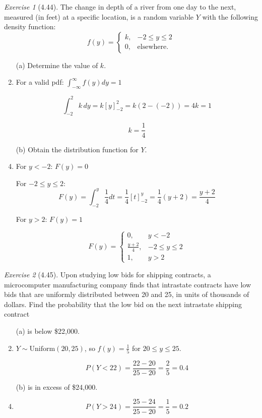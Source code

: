 \documentclass[12pt]{amsart}
\makeatletter
\theoremstyle{remark}
\newtheorem*{exercise}{Exercise}%
\renewenvironment{proof}[1][\proofname]{\par\doublespacing
  \pushQED{\qed}%
  \normalfont \topsep6\p@\@plus6\p@\relax
  \list{}{%
    \settowidth{\leftmargin}{\itshape\proofname:\hskip\labelsep}%
    \setlength{\labelwidth}{0pt}%
    \setlength{\itemindent}{-\leftmargin}%
  }%
  \item[\hskip\labelsep\itshape#1\@addpunct{:}]\ignorespaces
}{%
  \popQED\endlist\@endpefalse
  \singlespacing
}
\theoremstyle{mycomment}
\makeatother
\begin{document}
\begin{exercise}[4.44]
The change in depth of a river from one day to the next, measured (in feet) at a specific location, is a random variable $Y$ with the following density function:
$$f(y) = \begin{cases}
k, & -2 \leq y \leq 2 \\
0, & \text{elsewhere}.
\end{cases}$$

\begin{enumerate}
    \item[(a)] Determine the value of $k$.
\begin{proof}[Solution]
For a valid pdf: $\int_{-\infty}^{\infty} f(y) dy = 1$

$$\int_{-2}^{2} k \, dy = k[y]_{-2}^{2} = k(2 - (-2)) = 4k = 1$$

$$k = \frac{1}{4}$$
\end{proof}

    \item[(b)] Obtain the distribution function for $Y$.
\begin{proof}[Solution]
For $y < -2$: $F(y) = 0$

For $-2 \leq y \leq 2$:
$$F(y) = \int_{-2}^{y} \frac{1}{4} dt = \frac{1}{4}[t]_{-2}^{y} = \frac{1}{4}(y + 2) = \frac{y + 2}{4}$$

For $y > 2$: $F(y) = 1$

$$F(y) = \begin{cases}
0, & y < -2 \\
\frac{y + 2}{4}, & -2 \leq y \leq 2 \\
1, & y > 2
\end{cases}$$
\end{proof}
\end{enumerate}
\end{exercise}
\begin{exercise}[4.45]
Upon studying low bids for shipping contracts, a microcomputer manufacturing company finds that intrastate contracts have low bids that are uniformly distributed between 20 and 25, in units of thousands of dollars. Find the probability that the low bid on the next intrastate shipping contract

\begin{enumerate}
    \item[(a)] is below \$22,000.
\begin{proof}[Solution]
$Y \sim \text{Uniform}(20, 25)$, so $f(y) = \frac{1}{5}$ for $20 \leq y \leq 25$.

$$P(Y < 22) = \frac{22 - 20}{25 - 20} = \frac{2}{5} = 0.4$$
\end{proof}

    \item[(b)] is in excess of \$24,000.
\begin{proof}[Solution]
$$P(Y > 24) = \frac{25 - 24}{25 - 20} = \frac{1}{5} = 0.2$$
\end{proof}
\end{enumerate}
\end{exercise}
\end{document}
